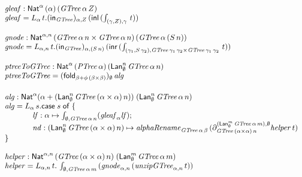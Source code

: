 \documentclass[acmsmall,review,anonymous]{acmart}
\theoremstyle{definition}
\begin{document}
\[\begin{array}{l}
  \mathit{gleaf} : \Nat^{\alpha}\, (\alpha) \, (\mathit{GTree}\,\alpha\,Z) \\
  \mathit{gleaf} = L_\alpha \, t. (\tin_{\mathit{GTree}})_{\alpha,Z} \, (\inl \, (\int_{(\gamma, Z), \gamma} \, t)) \\ \\ 

  \mathit{gnode} : \Nat^{\alpha, n}\, (\mathit{GTree}\,\alpha\,n \times \mathit{GTree}\,\alpha\,n) \, (\mathit{GTree}\,\alpha\, (S\,n)) \\
  \mathit{gnode} = L_{\alpha, n} \, t. (\tin_{\mathit{GTree}})_{\alpha,(S\,n)} \, (\inr \, (\int_{(\gamma_1, S\,\gamma_2), \mathit{GTree}\,\gamma_1\,\gamma_2\times\mathit{GTree}\,\gamma_1\,\gamma_2} \, t)) \\ \\ 

  \mathit{ptreeToGTree} : \Nat^\alpha \, (\mathit{PTree}\,\alpha)\,(\Lan^n_\emptyset \, \mathit{GTree}\,\alpha\,n) \\
  \vspace{0.05in}
  \mathit{ptreeToGTree} = (\fold_{\beta + \phi\,(\beta \times \beta)})_\emptyset \, \mathit{alg} \\ \\ 
  \mathit{alg} : \Nat^\alpha (\alpha + (\Lan^n_\emptyset \, \mathit{GTree}\,(\alpha \times \alpha) \,n)) 
    \; (\Lan^n_\emptyset \,\mathit{GTree}\,\alpha\,n) \\
  \mathit{alg} = L_\alpha \,s. \mathsf{case} \;s \; \mathsf{of} \; \{ \\
    \hspace{0.5in} \mathit{lf} : \alpha \mapsto \int_{\emptyset, \mathit{GTree}\,\alpha\,n} (\mathit{gleaf}_\alpha \mathit{lf})  ; \\
    \hspace{0.5in} \mathit{nd}
    : (\Lan^n_\emptyset \,\mathit{GTree}\,(\alpha \times \alpha)\,n) 
    \mapsto \mathit{alphaRename}_{\mathit{GTree}\,\alpha\,\beta}\, ( \partial^{(\Lan^m_\emptyset \,\mathit{GTree}\,\alpha\,m),\emptyset}_{\mathit{GTree}\,(\alpha \times \alpha)\,n} \mathit{helper} \,t ) \\
    \}\\ \\

  \mathit{helper} : \Nat^{\alpha,n}\,
  (\mathit{GTree}\,(\alpha\times\alpha)\,n) \;(\Lan^m_\emptyset\,\mathit{GTree}\,\alpha\,m) \\
  \mathit{helper} = L_{\alpha, n} \, t. \, \int_{\emptyset, \mathit{GTree}\,\alpha\,m}  \,  (\mathit{gnode}_{\alpha, n}  \,  (\mathit{unzipGTree}_{\alpha, n} \, t)) \\ \\


\end{array}\]
\end{document}
